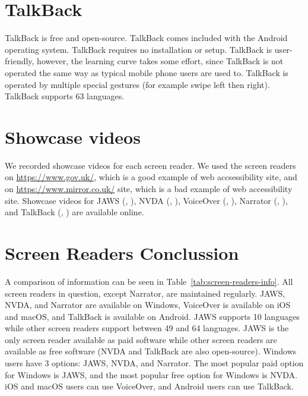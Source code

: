 \section{TalkBack}

TalkBack is free and open-source. TalkBack comes included with the Android operating system. TalkBack requires no installation or setup. TalkBack is user-friendly, however, the learning curve takes some effort, since TalkBack is not operated the same way as typical mobile phone users are used to. TalkBack is operated by multiple special gestures (for example swipe left then right). TalkBack supports 63 languages.

\section{Showcase videos}
We recorded showcase videos for each screen reader. We used the screen readers on \url{https://www.gov.uk/}, which is a good example of web accsessibility site, and on \url{https://www.mirror.co.uk/} site, which is a bad example of web accessibility site.
Showcase videos for JAWS (\parencite{JAWS_gov}, \parencite{JAWS_mirror}), NVDA (\parencite{NVDA_gov}, \parencite{NVDA_mirror}), VoiceOver (\parencite{VoiceOver_gov}, \parencite{VoiceOver_mirror}), Narrator (\parencite{Narrator_gov}, \parencite{Narrator_mirror}), and TalkBack (\parencite{TalkBack_gov}, \parencite{TalkBack_mirror}) are available online.

\section{Screen Readers Conclussion}

A comparison of information can be seen in  Table~\ref{tab:screen-readers-info}. All screen readers in question, except Narrator, are maintained regularly. JAWS, NVDA, and Narrator are available on Windows, VoiceOver is available on iOS and macOS, and TalkBack is available on Android. JAWS supports 10 languages while other screen readers support between 49 and 64 languages. JAWS is the only screen reader available as paid software while other screen readers are available as free software (NVDA and TalkBack are also open-source). Windows users have 3 options: JAWS, NVDA, and Narrator. The most popular paid option for Windows is JAWS, and the most popular free option for Windows is NVDA. iOS and macOS users can use VoiceOver, and Android users can use TalkBack.

